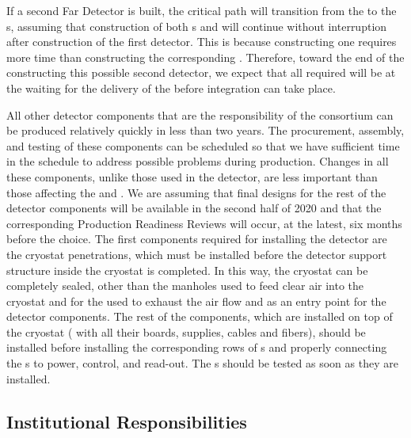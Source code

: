 If a second   Far Detector is built, the critical
path will transition from the 
to the s, assuming that construction
of both s and  will continue 
without interruption after construction of the first detector. 
This is because constructing one  requires 
more time than constructing the corresponding . Therefore,
toward the end of the constructing this possible second detector,
we expect that all required  will be at the
 waiting for the delivery of the  before
integration can take place.

All other detector components that are the responsibility of the
 consortium can be produced relatively quickly
in less than two years. The procurement, assembly, and
testing of these components can be scheduled so that
we have sufficient time in the schedule to address possible 
problems during production. Changes in all these
components, unlike those used in the  detector,
are less important than those affecting the 
and . We are assuming that final
designs for the rest of the detector components will be 
available in the second half of 2020 and that the corresponding 
Production Readiness Reviews will occur, at the latest, six months 
before the  choice.
The first components 
required for installing the detector are the cryostat 
penetrations, which must be installed before the 
detector support structure inside the cryostat is completed.
In this way, the cryostat can be completely sealed, other than
the manholes used to feed clear air into the cryostat
and for the  used to exhaust the air flow
and as an entry point for the detector components. The rest of the
 components, which are installed on top of the 
cryostat ( with all their boards, supplies, cables
and fibers), should be installed before installing
the corresponding rows of s and properly connecting 
the s to power, control, and read-out. 
The s should be tested as soon as they are installed. 

\subsection{Institutional Responsibilities}
\label{sec:fdsp-tpcelec-management-resp}

